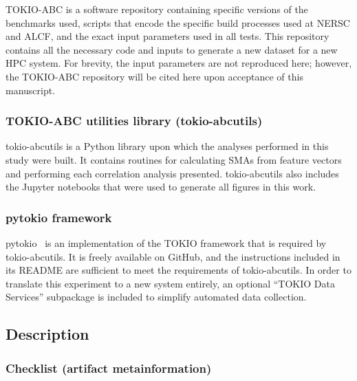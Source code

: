 TOKIO-ABC is a software repository containing specific versions of the benchmarks used, scripts that encode the specific build processes used at NERSC and ALCF, and the exact input parameters used in all tests.
This repository contains all  the necessary code and inputs to generate a new dataset for a new HPC system.
For brevity, the input parameters are not reproduced here; however, the TOKIO-ABC repository will be cited here upon acceptance of this manuscript.

\subsubsection{TOKIO-ABC utilities library (tokio-abcutils)}

tokio-abcutils is a Python library upon which the analyses performed in this study were built.
It contains routines for calculating SMAs from feature vectors and performing each correlation analysis presented.
tokio-abcutils also includes the Jupyter notebooks that were used to generate all figures in this work.

\subsubsection{pytokio framework}

pytokio~\cite{Lockwood2018tokio} is an implementation of the TOKIO framework that is required by tokio-abcutils.
It is freely available on GitHub, and the instructions included in its README are sufficient to meet the requirements of tokio-abcutils.
In order to translate this experiment to a new system entirely, an optional ``TOKIO Data Services'' subpackage is included to simplify automated data collection.

\subsection{Description}

\subsubsection{Checklist (artifact metainformation)}

